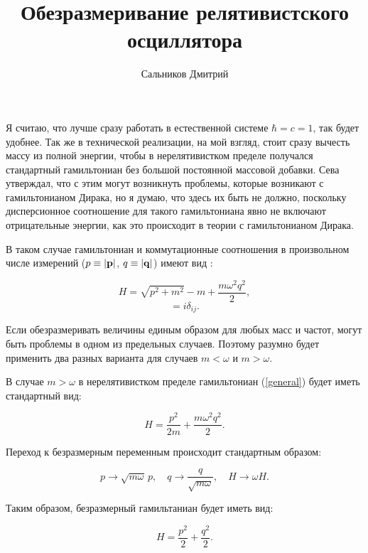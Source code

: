 \documentclass[12pt,a4paper,oneside]{article}
\title{Обезразмеривание релятивистского осциллятора}
\author{Сальников Дмитрий}
\begin{document}
\maketitle

Я считаю, что лучше сразу работать в естественной системе $\hbar = c = 1$, так будет удобнее. Так же в технической реализации, на мой взгляд, стоит сразу вычесть массу из полной энергии, чтобы в нерелятивистком пределе получался стандартный гамильтониан без большой постоянной массовой добавки. Сева утверждал, что с этим могут возникнуть проблемы, которые возникают с гамильтонианом Дирака, но я думаю, что здесь их быть не должно, поскольку дисперсионное соотношение для такого гамильтониана явно не включают отрицательные энергии, как это происходит в теории с гамильтонианом Дирака.

В таком случае гамильтониан и коммутационные соотношения в произвольном числе измерений ($p \equiv |{\bf p}|$, $q \equiv |{\bf q}|$)  имеют вид :

\begin{equation}\label{general}
H = \sqrt{p^2 + m^2} - m + \dfrac{m\omega^2 q^2}{2},
\end{equation}
\begin{equation}
[q_i, p_j] = i\delta_{ij}.
\end{equation}


Если обезразмеривать величины единым образом для любых масс и частот, могут быть проблемы в одном из предельных случаев. Поэтому разумно будет применить два разных варианта для случаев $m < \omega$ и $m > \omega$.

В случае $m > \omega$ в нерелятивистком пределе гамильтониан (\ref{general}) будет иметь стандартный вид:

\begin{equation}
H = \dfrac{p^2}{2m} + \dfrac{m\omega^2 q^2}{2}.
\end{equation}

Переход к безразмерным переменным происходит стандартным образом:

\begin{equation}
p \to \sqrt{m\omega} \, p, \quad q \to \frac{q}{\sqrt{m\omega}}, \quad H \to \omega H.
\end{equation}

Таким образом, безразмерный гамильтаниан будет иметь вид:

\begin{equation}\label{nonrelativistic}
H =  \dfrac{p^2}{2} + \dfrac{q^2}{2}.
\end{equation}
\end{document}
